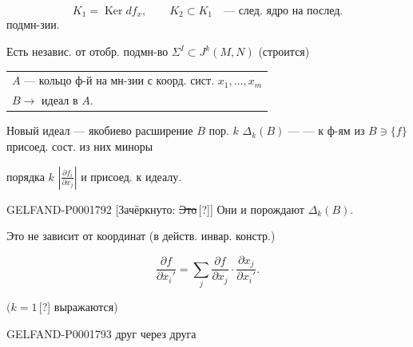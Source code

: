 \begin{equation*}K_1=\operatorname{Ker}df_x,\qquad K_2\subset K_1\quad\text{— след. ядро на послед.}\end{equation*}
подмн-зии.

Есть независ. от отобр. подмн-во $\Sigma^I\subset J^k(M,N)$ (строится)

\begin{tabular}{||p{.90\linewidth}}
$A$ — кольцо ф-й на мн-зии с коорд. сист. $x_1,\ldots,x_m$\\
$B\longrightarrow$ идеал в $A$.
\end{tabular}

Новый идеал — якобиево расширение $B$ пор. $k$ $\Delta_k(B)$ — — к ф-ям из $B\ni\{f\}$ присоед. сост. из них миноры

порядка $k$ $\left|\frac{\partial f_i}{\partial x_j}\right|$ и присоед. к идеалу.

\begin{GelfandAdjacentEvidence}{GELFAND-P000179}{2}
[Зачёркнуто: \sout{Это}\,[?]] Они и порождают $\Delta_k(B)$.
\end{GelfandAdjacentEvidence}

Это не зависит от координат (в действ. инвар. констр.)

\begin{equation*}\frac{\partial f}{\partial x_i'}=\sum_j\frac{\partial f}{\partial x_j}\cdot\frac{\partial x_j}{\partial x_i'}.\end{equation*}

$(k=1$\,[?] выражаются)

\begin{GelfandAdjacentEvidence}{GELFAND-P000179}{3}
друг через друга
\end{GelfandAdjacentEvidence}



\clearpage

